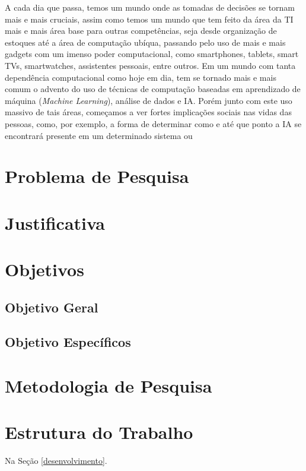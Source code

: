 \label{introducao}


A cada dia que passa, temos um mundo onde as tomadas de decisões se tornam mais e mais cruciais, assim como temos um mundo que tem feito da área da \acrshort{TI} mais e mais área base para outras competências, seja desde organização de estoques até a área de computação ubíqua, passando pelo uso de mais e mais gadgets com um imenso poder computacional, como smartphones, tablets, smart TVs, smartwatches, assistentes pessoais, entre outros. Em um mundo com tanta dependência computacional como hoje em dia, tem se tornado mais e mais comum o advento do uso de técnicas de computação baseadas em aprendizado de máquina (\textit{Machine Learning}), análise de dados e \acrshort{IA}. Porém junto com este uso massivo de tais áreas, começamos a ver fortes implicações sociais nas vidas das pessoas, como, por exemplo, a forma de determinar como e até que ponto a \acrshort{IA} se encontrará presente em um determinado sistema ou  


\section{Problema de Pesquisa}


\section{Justificativa}


\section{Objetivos}


\subsection{Objetivo Geral}


\subsection{Objetivo Específicos}


\section{Metodologia de Pesquisa}


\section{Estrutura do Trabalho}
Na Seção \ref{desenvolvimento}.

